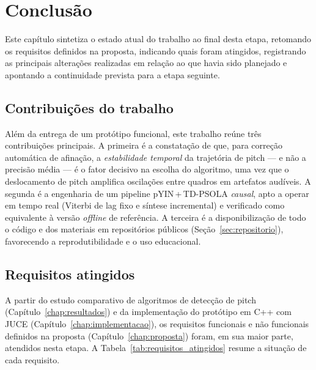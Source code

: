 \chapter{\label{chap:conclusao}Conclusão}

Este capítulo sintetiza o estado atual do trabalho ao final desta etapa,
retomando os requisitos definidos na proposta, indicando quais foram atingidos,
registrando as principais alterações realizadas em relação ao que havia sido
planejado e apontando a continuidade prevista para a etapa seguinte.

\section{Contribuições do trabalho}

Além da entrega de um protótipo funcional, este trabalho reúne três contribuições principais. A primeira é a constatação de que, para correção automática de afinação, a \emph{estabilidade temporal} da trajetória de pitch --- e não a precisão média --- é o fator decisivo na escolha do algoritmo, uma vez que o deslocamento de pitch amplifica oscilações entre quadros em artefatos audíveis. A segunda é a engenharia de um pipeline pYIN\,+\,TD-PSOLA \emph{causal}, apto a operar em tempo real (Viterbi de lag fixo e síntese incremental) e verificado como equivalente à versão \textit{offline} de referência. A terceira é a disponibilização de todo o código e dos materiais em repositórios públicos (Seção~\ref{sec:repositorio}), favorecendo a reprodutibilidade e o uso educacional.

\section{Requisitos atingidos}

A partir do estudo comparativo de algoritmos de detecção de pitch
(Capítulo~\ref{chap:resultados}) e da implementação do protótipo em C++ com JUCE
(Capítulo~\ref{chap:implementacao}), os requisitos funcionais e não funcionais
definidos na proposta (Capítulo~\ref{chap:proposta}) foram, em sua maior parte,
atendidos nesta etapa. A Tabela~\ref{tab:requisitos_atingidos} resume a situação
de cada requisito.

